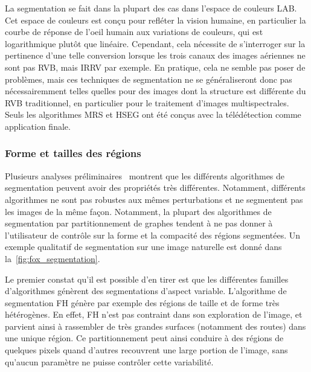 La segmentation se fait dans la plupart des cas dans l'espace de couleurs LAB. Cet espace de couleurs est conçu pour refléter la vision humaine, en particulier la courbe de réponse de l'oeil humain aux variations de couleurs, qui est logarithmique plutôt que linéaire. Cependant, cela nécessite de s'interroger sur la pertinence d'une telle conversion lorsque les trois canaux des images aériennes ne sont pas \gls{RVB}, mais \gls{IRRV} par exemple. En pratique, cela ne semble pas poser de problèmes, mais ces techniques de segmentation ne se généraliseront donc pas nécessairemment telles quelles pour des images dont la structure est différente du \gls{RVB} traditionnel, en particulier pour le traitement d'images multispectrales. Seuls les algorithmes \gls{MRS} et \gls{HSEG} ont été conçus avec la télédétection comme application finale.

\subsubsection{Forme et tailles des régions}

Plusieurs analyses préliminaires~\cite{neubert_superpixel_2012,achanta_slic_2012} montrent que les différents algorithmes de segmentation peuvent avoir des propriétés très différentes. Notamment, différents algorithmes ne sont pas robustes aux mêmes perturbations et ne segmentent pas les images de la même façon. Notamment, la plupart des algorithmes de segmentation par partitionnement de graphes tendent à ne pas donner à l'utilisateur de contrôle sur la forme et la compacité des régions segmentées. Un exemple qualitatif de segmentation sur une image naturelle est donné dans la~\cref{fig:fox_segmentation}.

Le premier constat qu'il est possible d'en tirer est que les différentes familles d'algorithmes génèrent des segmentations d'aspect variable. L'algorithme de segmentation \gls{FH} génère par exemple des régions de taille et de forme très hétérogènes. En effet, \gls{FH} n'est pas contraint dans son exploration de l'image, et parvient ainsi à rassembler de très grandes surfaces (notamment des routes) dans une unique région. Ce partitionnement peut ainsi conduire à des régions de quelques pixels quand d'autres recouvrent une large portion de l'image, sans qu'aucun paramètre ne puisse contrôler cette variabilité.

